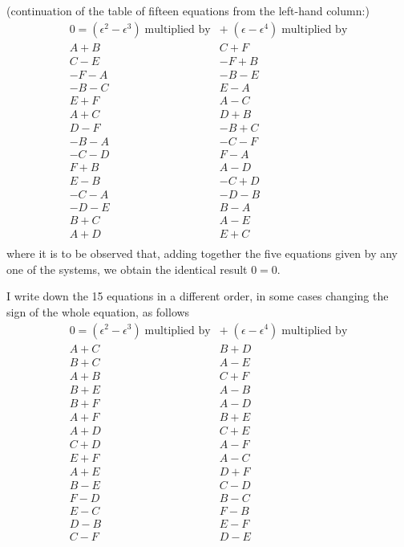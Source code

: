\documentclass[11pt]{article}
\begin{document}
\noindent (continuation of the table of fifteen equations from the left-hand column:)
\[
\begin{array}{c|c}
0 = (\epsilon^{2} - \epsilon^{3})\;\text{multiplied by} & +\;(\epsilon - \epsilon^{4})\;\text{multiplied by} \\
\hline
A + B & C + F \\
C - E & -F + B \\
-F - A & -B - E \\
-B - C & E - A \\
E + F & A - C \\
\hline
A + C & D + B \\
D - F & -B + C \\
-B - A & -C - F \\
-C - D & F - A \\
F + B & A - D \\
\hline
E - B & -C + D \\
-C - A & -D - B \\
-D - E & B - A \\
B + C & A - E \\
A + D & E + C \\
\end{array}
\]
where it is to be observed that, adding together the five equations given by any one of the systems, we obtain the identical result $0 = 0$.

I write down the 15 equations in a different order, in some cases changing the sign of the whole equation, as follows
\[
\begin{array}{c|c}
0 = (\epsilon^{2} - \epsilon^{3})\;\text{multiplied by} & +\;(\epsilon - \epsilon^{4})\;\text{multiplied by} \\
\hline
A + C & B + D \\
B + C & A - E \\
A + B & C + F \\
B + E & A - B \\
B + F & A - D \\
\hline
A + F & B + E \\
A + D & C + E \\
C + D & A - F \\
E + F & A - C \\
A + E & D + F \\
\hline
B - E & C - D \\
F - D & B - C \\
E - C & F - B \\
D - B & E - F \\
C - F & D - E \\
\end{array}
\]
\end{document}
